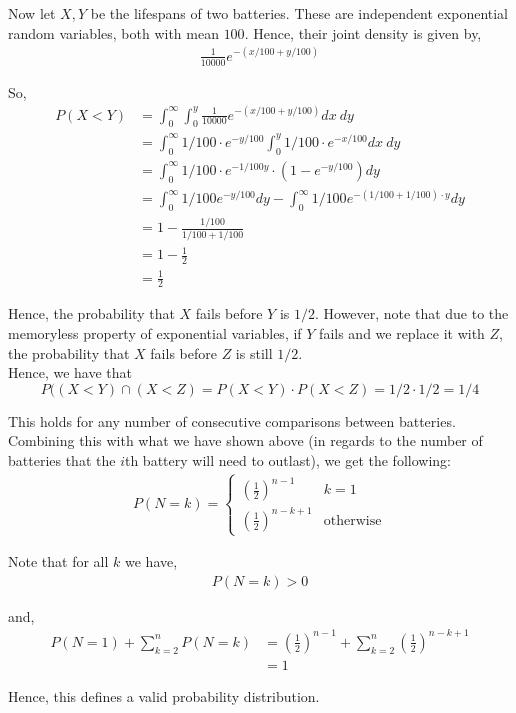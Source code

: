 \documentclass[12pt]{article}
\begin{document}
\begin{enumerate}[label=(\alph*)]
Now let $X, Y$ be the lifespans of two batteries. These are independent exponential random variables, both with mean $100$. Hence, their joint density is given by,
\begin{align*}
\frac{1}{10000}e^{-(x/100 + y/100)}
\end{align*}

So,
\begin{align*}
P(X < Y) &= \int_0^{\infty} \int_0^y \frac{1}{10000}e^{-(x/100 + y/100)} dx \ dy\\
&= \int_0^{\infty} 1/100 \cdot e^{-y/100} \int_0^y 1/100 \cdot e^{-x/100} dx \ dy\\
&= \int_0^{\infty} 1/100 \cdot e^{-1/100 y} \cdot (1 - e^{-y/100}) dy\\
&= \int_0^{\infty} 1/100 e^{-y/100} dy - \int_0^{\infty} 1/100 e^{-(1/100 + 1/100) \cdot y} dy\\
&= 1 - \frac{1/100}{1/100 + 1/100}\\
&= 1 - \frac{1}{2}\\
&= \frac{1}{2}
\end{align*}

Hence, the probability that $X$ fails before $Y$ is $1/2$. However, note that due to the memoryless property of exponential variables, if $Y$ fails and we replace it with $Z$, the probability that $X$ fails before $Z$ is still $1/2$.\\

Hence, we have that $$P((X < Y) \cap (X < Z) = P(X < Y) \cdot P(X < Z) = 1/2 \cdot 1/2 = 1/4$$

This holds for any number of consecutive comparisons between batteries. Combining this with what we have shown above (in regards to the number of batteries that the $i$th battery will need to outlast), we get the following:
\begin{align*}
P(N = k) = \begin{cases}
\left(\frac{1}{2}\right)^{n - 1} & k = 1\\
\left(\frac{1}{2}\right)^{n - k + 1} & \text{otherwise}
\end{cases}
\end{align*}

Note that for all $k$ we have,
\begin{align*}
P(N = k) > 0
\end{align*}

and,
\begin{align*}
P(N = 1) + \sum_{k=2}^{n} P(N = k) &= \left(\frac{1}{2}\right)^{n - 1} + \sum_{k = 2}^n \left(\frac{1}{2}\right)^{n - k + 1}\\
&= 1
\end{align*}

Hence, this defines a valid probability distribution.
\end{enumerate}
\end{document}
